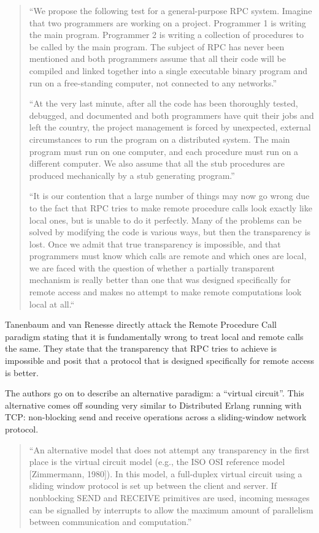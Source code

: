 \begin{quote}
``We propose the following test for a general-purpose RPC system. Imagine that two programmers are working on a project. Programmer 1 is writing the main program. Programmer 2 is writing a collection of procedures to be called by the main program. The subject of RPC has never been mentioned and both programmers assume that all their code will be compiled and linked together into a single executable binary program and run on a free-standing computer, not connected to any networks.''	

``At the very last minute, after all the code has been thoroughly tested, debugged, and documented and both programmers have quit their jobs and left the country, the project management is forced by unexpected, external circumstances to run the program on a distributed system. The main program must run on one computer, and each procedure must run on a different computer. We also assume that all the stub procedures are produced mechanically by a stub generating program.''

``It is our contention that a large number of things may now go wrong due to the fact that RPC tries to make remote procedure calls look exactly like local ones, but is unable to do it perfectly. Many of the problems can be solved by modifying the code is various ways, but then the transparency is lost. Once we admit that true transparency is impossible, and that programmers must know which calls are remote and which ones are local, we are faced with the question of whether a partially transparent mechanism is really better than one that was designed specifically for remote access and makes no attempt to make remote computations look local at all.``
\end{quote}

Tanenbaum and van Renesse directly attack the Remote Procedure Call paradigm stating that it is fundamentally wrong to treat local and remote calls the same.  They state that the transparency that RPC tries to achieve is impossible and posit that a protocol that is designed specifically for remote access is better.

The authors go on to describe an alternative paradigm: a ``virtual circuit''.  This alternative comes off sounding very similar to Distributed Erlang running with TCP: non-blocking send and receive operations across a sliding-window network protocol.

\begin{quote}
``An alternative model that does not attempt any transparency in the first place is the virtual circuit model (e.g., the ISO OSI reference model [Zimmermann, 1980]). In this model, a full-duplex virtual circuit using a sliding window protocol is set up between the client and server. If nonblocking SEND and RECEIVE primitives are used, incoming messages can be signalled by interrupts to allow the maximum amount of parallelism between communication and computation.''
\end{quote}

